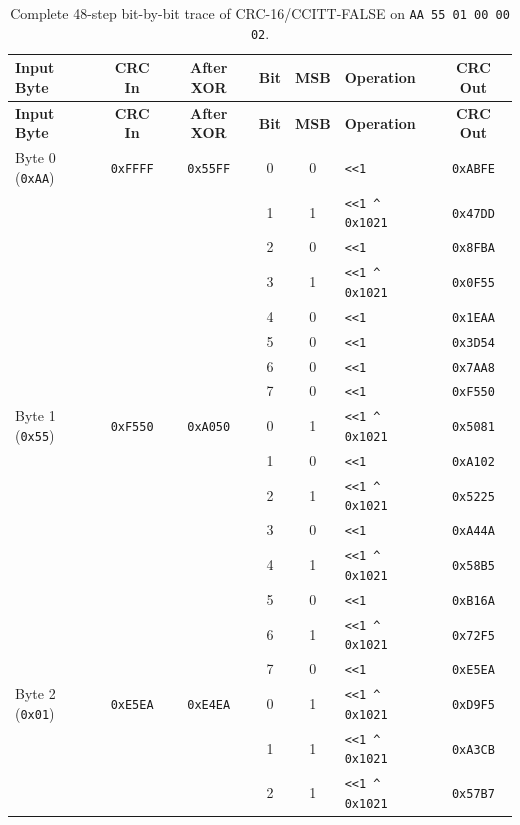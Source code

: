\documentclass[11pt,a4paper,oneside]{report}
\begin{document}
\begin{longtable}{l c c c c l c}
\caption{Complete 48-step bit-by-bit trace of CRC-16/CCITT-FALSE on \texttt{AA 55 01 00 00 02}.}
\label{tab:ch2_crc_trace} \\
\toprule
\textbf{Input Byte} & \textbf{CRC In} & \textbf{After XOR} & \textbf{Bit} & \textbf{MSB} & \textbf{Operation} & \textbf{CRC Out} \\
\midrule
\endfirsthead
\toprule
\textbf{Input Byte} & \textbf{CRC In} & \textbf{After XOR} & \textbf{Bit} & \textbf{MSB} & \textbf{Operation} & \textbf{CRC Out} \\
\midrule
\endhead
\bottomrule
\endfoot
Byte 0 (\texttt{0xAA}) & \texttt{0xFFFF} & \texttt{0x55FF} & 0 & 0 & \texttt{<<1} & \texttt{0xABFE} \\
 &  &  & 1 & 1 & \texttt{<<1 \^{} 0x1021} & \texttt{0x47DD} \\
 &  &  & 2 & 0 & \texttt{<<1} & \texttt{0x8FBA} \\
 &  &  & 3 & 1 & \texttt{<<1 \^{} 0x1021} & \texttt{0x0F55} \\
 &  &  & 4 & 0 & \texttt{<<1} & \texttt{0x1EAA} \\
 &  &  & 5 & 0 & \texttt{<<1} & \texttt{0x3D54} \\
 &  &  & 6 & 0 & \texttt{<<1} & \texttt{0x7AA8} \\
 &  &  & 7 & 0 & \texttt{<<1} & \texttt{0xF550} \\
\midrule
Byte 1 (\texttt{0x55}) & \texttt{0xF550} & \texttt{0xA050} & 0 & 1 & \texttt{<<1 \^{} 0x1021} & \texttt{0x5081} \\
 &  &  & 1 & 0 & \texttt{<<1} & \texttt{0xA102} \\
 &  &  & 2 & 1 & \texttt{<<1 \^{} 0x1021} & \texttt{0x5225} \\
 &  &  & 3 & 0 & \texttt{<<1} & \texttt{0xA44A} \\
 &  &  & 4 & 1 & \texttt{<<1 \^{} 0x1021} & \texttt{0x58B5} \\
 &  &  & 5 & 0 & \texttt{<<1} & \texttt{0xB16A} \\
 &  &  & 6 & 1 & \texttt{<<1 \^{} 0x1021} & \texttt{0x72F5} \\
 &  &  & 7 & 0 & \texttt{<<1} & \texttt{0xE5EA} \\
\midrule
Byte 2 (\texttt{0x01}) & \texttt{0xE5EA} & \texttt{0xE4EA} & 0 & 1 & \texttt{<<1 \^{} 0x1021} & \texttt{0xD9F5} \\
 &  &  & 1 & 1 & \texttt{<<1 \^{} 0x1021} & \texttt{0xA3CB} \\
 &  &  & 2 & 1 & \texttt{<<1 \^{} 0x1021} & \texttt{0x57B7} \\

\end{longtable}
\end{document}
